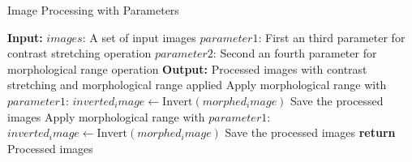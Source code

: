 \documentclass{article}
\begin{document}
 \begin{algorithm}
\caption{Image Processing with Parameters}\label{image_processing_algo}
\begin{algorithmic}[1]
    \State \textbf{Input:} 
        \Statex \hspace{\algorithmicindent} $images$: A set of input images
        \Statex \hspace{\algorithmicindent} $parameter1$: First an third parameter for contrast stretching operation
        \Statex \hspace{\algorithmicindent} $parameter2$: Second an fourth parameter for morphological range operation
    \State \textbf{Output:} 
        \Statex \hspace{\algorithmicindent} Processed images with contrast stretching and morphological range applied
        \State Apply morphological range with $parameter1$: 
        \State \hspace{\algorithmicindent} 
        \State $inverted_image \gets \text{Invert}(morphed_image)$
        \State \hspace{\algorithmicindent} 
        \State Save the processed images
    \EndFor
        \State Apply morphological range with $parameter1$: 
        \State \hspace{\algorithmicindent} 
        \State $inverted_image \gets \text{Invert}(morphed_image)$
        \State \hspace{\algorithmicindent} 
        \State Save the processed images
    \EndFor
    \State \textbf{return} Processed images
\EndProcedure
\end{algorithmic}
\end{algorithm}
\end{document}
